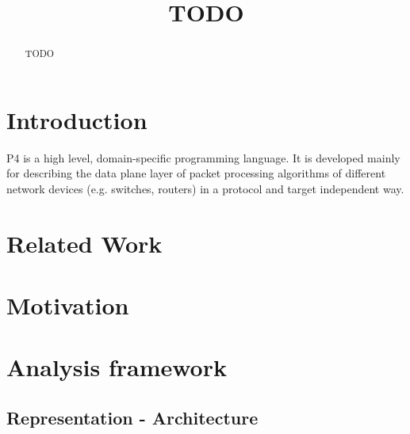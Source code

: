 \documentclass[sigconf]{acmart}
\begin{document}
	
	
	\title{TODO}
	
	
	\author{}
	\email{}
	\orcid{}
	\author{}
	\authornotemark[]
	\email{}
	\affiliation{%
		\institution{}
		\streetaddress{}
		\city{}
		\state{}
		\country{}
		\postcode{}
	}
	
	
	\begin{abstract}
		TODO
	\end{abstract}
	

	
	
	
	\maketitle
	
	\section{Introduction}
	P4 \cite{p4paper} is a high level, domain-specific programming language. It is developed mainly for
describing the data plane layer of packet processing algorithms of different network
devices (e.g. switches, routers) in a protocol and target independent way. 
	
	
	\section{Related Work}
	

	\section{Motivation}
	
	\section{Analysis framework}



	\subsection{Representation - Architecture} %
\end{document}
